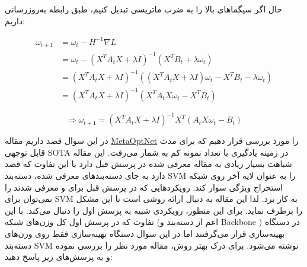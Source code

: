 \documentclass{article}
\begin{document}
\begin{enumerate}
	
	حال اگر سیگماهای بالا را به ضرب ماتریسی تبدیل کنیم،‌ طبق رابطه به‌روزرسانی داریم:
	
	$$
	\begin{aligned}
		{\omega _{t + 1}} & = {\omega _t} - {H^{ - 1}}\nabla L\\
		& = {\omega _t} - {\left( {{X^T}{A_t}X + \lambda I} \right)^{ - 1}}\left( {{X^T}{B_t} + \lambda {\omega _t}} \right)\\
		&‌= {\left( {{X^T}{A_t}X + \lambda I} \right)^{ - 1}}\left( {\left( {{X^T}{A_t}X + \lambda I} \right){\omega _t} - {X^T}{B_t} - \lambda {\omega _t}} \right)\\
		&‌= {\left( {{X^T}{A_t}X + \lambda I} \right)^{ - 1}}\left( {{X^T}{A_t}X{\omega _t} - {X^T}{B_t}} \right)
	\end{aligned}
	$$
	
	$$
	\Rightarrow
	{\omega _{t + 1}} = {\left( {{X^T}{A_t}X + \lambda I} \right)^{ - 1}}{X^T}\left( {{A_t}X{\omega _t} - {B_t}} \right)
	$$
	
\end{enumerate}



در این سوال قصد داریم مقاله 
\href{https://arxiv.org/abs/1904.03758}{MetaOptNet}
را مورد بررسی قرار دهیم که برای مدت قابل توجهی SOTA
 در زمینه یادگیری با تعداد نمونه کم 
 به شمار می‌رفت. این مقاله شباهت بسیار زیادی به مقاله معرفی شده در پرسش قبل دارد با این تفاوت که قصد دارد به جای دسته‌بندهای معرفی شده، دسته‌بند SVM را به عنوان لایه آخر روی شبکه استخراج ویژگی سوار کند. رویکردهایی که در پرسش قبل برای 
و
معرفی شدند را نمی‌توان برای SVM به کار برد. لذا این مقاله به دنبال ارائه روشی است تا این مشکل را برطرف نماید. برای این منظور، رویکردی شبیه به پرسش اول را دنبال می‌کند. با این تفاوت که در پرسش اول کل وزن‌های شبکه 
(اعم از دسته‌بند و
 Backbone
 ) 
در دستگاه بهینه‌سازی قرار می‌گرفتند اما در این سوال دستگاه بهینه‌سازی فقط روی وزن‌های دسته‌بند SVM نوشته می‌شود. برای درک بهتر روش، مقاله مورد نظر را بررسی نموده و به پرسش‌های زیر پاسخ دهید:
\end{document}
